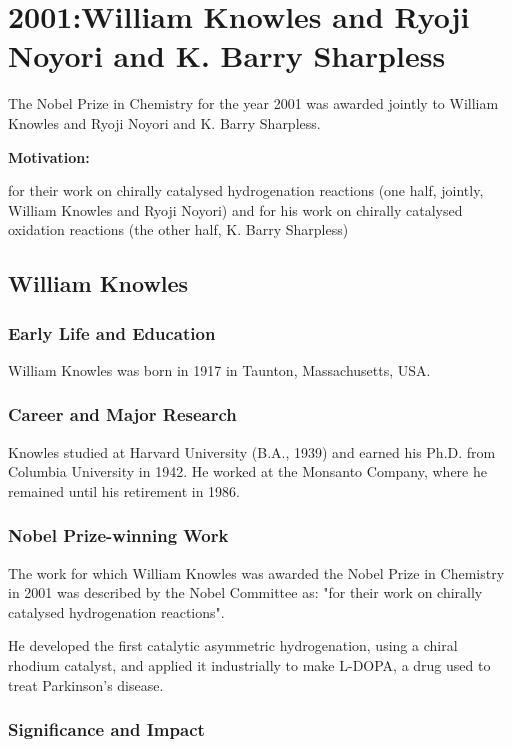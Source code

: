 \chapter{2001:William Knowles and Ryoji Noyori and K. Barry Sharpless}

\label{chap:chemistry2001}

The Nobel Prize in Chemistry for the year 2001 was awarded jointly to William Knowles and Ryoji Noyori and K. Barry Sharpless.

\textbf{Motivation:}

for their work on chirally catalysed hydrogenation reactions (one half, jointly, William Knowles and Ryoji Noyori) and for his work on chirally catalysed oxidation reactions (the other half, K. Barry Sharpless)

\section{William Knowles}

\subsection*{Early Life and Education}

William Knowles was born in 1917 in Taunton, Massachusetts, USA.

\subsection*{Career and Major Research}

Knowles studied at Harvard University (B.A., 1939) and earned his Ph.D. from Columbia University in 1942. He worked at the Monsanto Company, where he remained until his retirement in 1986.

\subsection*{Nobel Prize-winning Work}

The work for which William Knowles was awarded the Nobel Prize in Chemistry in 2001 was described by the Nobel Committee as: "for their work on chirally catalysed hydrogenation reactions".

He developed the first catalytic asymmetric hydrogenation, using a chiral rhodium catalyst, and applied it industrially to make L-DOPA, a drug used to treat Parkinson's disease.

\subsection*{Significance and Impact}

